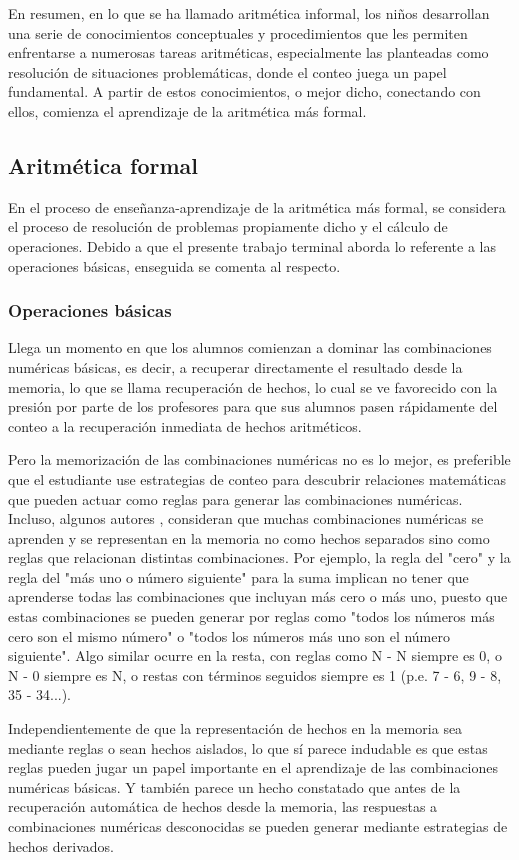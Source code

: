 \documentclass{article}
\begin{document}
En resumen, en lo que se ha llamado aritmética informal, los niños desarrollan una serie de conocimientos conceptuales y procedimientos que les permiten enfrentarse a numerosas tareas aritméticas, especialmente las planteadas como resolución de situaciones problemáticas, donde el conteo juega un papel fundamental. A partir de estos conocimientos, o mejor dicho, conectando con ellos, comienza el aprendizaje de la aritmética más formal.

\subsection{Aritmética formal} 
En el proceso de enseñanza-aprendizaje de la aritmética más formal, se considera el  proceso de resolución de problemas propiamente dicho y el cálculo de operaciones. Debido a que el presente trabajo terminal aborda lo referente a las operaciones básicas, enseguida se comenta al respecto.
\subsubsection{Operaciones básicas}
Llega un momento en que los alumnos comienzan a dominar las combinaciones numéricas básicas, es decir, a recuperar directamente el resultado desde la memoria, lo que se llama recuperación de hechos, lo cual se ve favorecido con la presión por parte de los profesores para que sus alumnos pasen rápidamente del conteo a la recuperación inmediata de hechos aritméticos.

Pero la memorización de las combinaciones numéricas no es lo mejor, es preferible que el estudiante use estrategias de conteo para descubrir relaciones matemáticas que pueden actuar como reglas para generar las combinaciones numéricas. Incluso, algunos autores \cite{fuson1996levels}, consideran que muchas combinaciones numéricas se aprenden y se representan en la memoria no como hechos separados sino como reglas que relacionan distintas combinaciones. Por ejemplo, la regla del "cero" y la regla del "más uno o número siguiente" para la suma implican no tener que aprenderse todas las combinaciones que incluyan más cero o más uno, puesto que estas combinaciones se pueden generar por reglas como "todos los números más cero son el mismo número" o "todos los números más uno son el número siguiente". Algo similar ocurre en la resta, con reglas como N - N siempre es 0, o N - 0 siempre es N, o restas con términos seguidos siempre es 1 (p.e. 7 - 6, 9 - 8, 35 - 34...).

Independientemente de que la representación de hechos en la memoria sea mediante reglas o sean hechos aislados, lo que sí parece indudable es que estas reglas pueden jugar un papel importante en el aprendizaje de las combinaciones numéricas básicas. Y también parece un hecho constatado que antes de la recuperación automática de hechos desde la memoria, las respuestas a combinaciones numéricas desconocidas se pueden generar mediante estrategias de hechos derivados.
\end{document}
